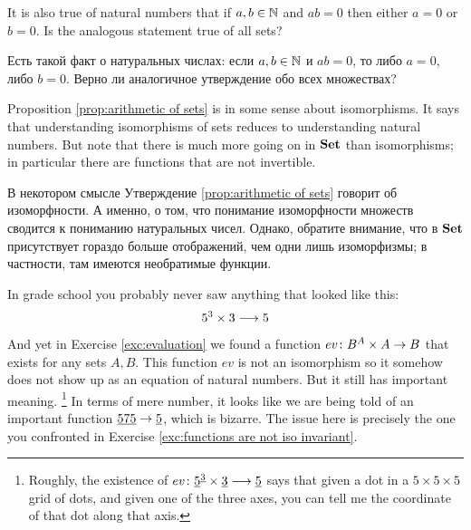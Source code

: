 \documentclass[CT4S-EN-RU]{subfiles}
\begin{document}
\begin{exerciseENG}
It is also true of natural numbers that if $a,b\in{\mathbb N}$ and $ab=0$ then either $a=0$ or $b=0$. Is the analogous statement true of all sets?
\end{exerciseENG}

\begin{exerciseRUS}
Есть такой факт о натуральных числах: если $a,b\in{\mathbb N}$ и $ab=0$, то либо $a=0$, либо $b=0$. Верно ли аналогичное утверждение обо всех множествах?
\end{exerciseRUS}

\begin{blockENG}
Proposition \ref{prop:arithmetic of sets} is in some sense about isomorphisms. It says that understanding isomorphisms of sets reduces to understanding natural numbers. But note that there is much more going on in ${\mathbf{Set}}$ than isomorphisms; in particular there are functions that are not invertible.
\end{blockENG}

\begin{blockRUS}
В некотором смысле Утверждение \ref{prop:arithmetic of sets} говорит об изоморфности. А именно, о том, что понимание изоморфности множеств сводится к пониманию натуральных чисел. Однако, обратите внимание, что в ${\mathbf{Set}}$ присутствует гораздо больше отображений, чем одни лишь изоморфизмы; в частности, там имеются необратимые функции.
\end{blockRUS}

\begin{blockENG}
In grade school you probably never saw anything that looked like this:
$$5^3\times 3\longrightarrow 5$$
And yet in Exercise \ref{exc:evaluation} we found a function $ev\colon B^A\times A\rightarrow B$ that exists for any sets $A,B$. This function $ev$ is not an isomorphism so it somehow does not show up as an equation of natural numbers. But it still has important meaning.%
\footnote{Roughly, the existence of $ev\colon\underline{5}^{\underline{3}}\times\underline{3}\longrightarrow \underline{5}$ says that given a dot in a $5\times 5\times 5$ grid of dots, and given one of the three axes, you can tell me the coordinate of that dot along that axis.} In terms of mere number, it looks like we are being told of an important function $\underline{575}\rightarrow\underline{5}$, which is bizarre. The issue here is precisely the one you confronted in Exercise \ref{exc:functions are not iso invariant}.
\end{blockENG}
\end{document}

